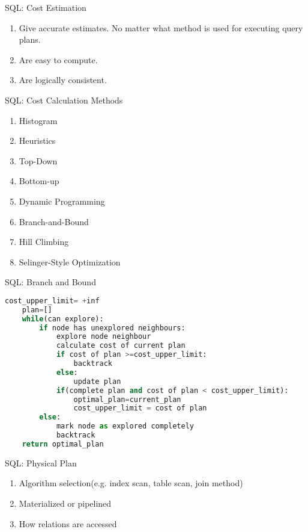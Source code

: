 \begin{frame}{SQL: Cost Estimation}
    \begin{enumerate}
        \item Give accurate estimates. No matter what method is used for executing query plans.
        \item Are easy to compute.
        \item Are logically consistent.
    \end{enumerate}
\end{frame}

\begin{frame}{SQL: Cost Calculation Methods}
    \begin{enumerate}
        \item Histogram
        \item Heuristics
        \item Top-Down
        \item Bottom-up
        \item Dynamic Programming
        \item Branch-and-Bound
        \item Hill Climbing
        \item Selinger-Style Optimization
    \end{enumerate}
\end{frame}

\begin{frame}[fragile]{SQL: Branch and Bound}
    \begin{lstlisting}[language=python]
    cost_upper_limit= +inf
    plan=[]
    while(can explore):
        if node has unexplored neighbours:
            explore node neighbour
            calculate cost of current plan
            if cost of plan >=cost_upper_limit:
                backtrack
            else:
                update plan
            if(complete plan and cost of plan < cost_upper_limit):
                optimal_plan=current_plan
                cost_upper_limit = cost of plan
        else:
            mark node as explored completely
            backtrack
    return optimal_plan
    \end{lstlisting}
\end{frame}

\begin{frame}{SQL: Physical Plan}
    \begin{enumerate}
        \item Algorithm selection(e.g. index scan, table scan, join method)
        \item Materialized or pipelined
        \item How relations are accessed
    \end{enumerate}
\end{frame}

